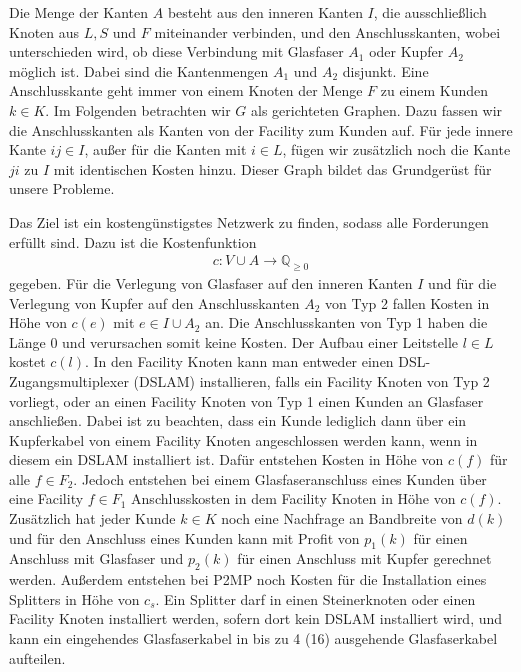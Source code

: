 \documentclass[11pt,a4paper]{article}
\newcommand{\Q}{\mathbb{Q}}
\theoremstyle{my_th_style1}
\begin{document}
Die Menge der Kanten $A$ besteht aus den inneren Kanten $I$, die ausschließlich Knoten aus \(L, S\) und \(F\) miteinander verbinden, und den Anschlusskanten, wobei unterschieden wird, ob diese Verbindung mit Glasfaser \(A_1\) oder Kupfer $A_2$ möglich ist.
Dabei sind die Kantenmengen $A_1$ und $A_2$ disjunkt.
Eine Anschlusskante geht immer von einem Knoten der Menge $F$ zu einem Kunden $k \in K$. 
Im Folgenden betrachten wir $G$ als gerichteten Graphen.
Dazu fassen wir die Anschlusskanten als Kanten von der Facility zum Kunden auf.
Für jede innere Kante $ij \in I$, außer für die Kanten mit $i \in L$, fügen wir zusätzlich noch die Kante $ji$ zu $I$ mit identischen Kosten hinzu.
Dieser Graph bildet das Grundgerüst für unsere Probleme.

Das Ziel ist ein kosteng\"unstigstes Netzwerk zu finden, sodass alle Forderungen erf\"ullt sind.
Dazu ist die Kostenfunktion 
\begin{align}
\label{Kostenfunktion}
c: V \cup A \rightarrow \Q_{\geq 0}
\end{align}
 gegeben.
Für die Verlegung von Glasfaser auf den inneren Kanten $I$ und f\"ur die Verlegung von Kupfer auf den Anschlusskanten \(A_2\) von Typ 2 fallen Kosten in Höhe von $c(e)$ mit $e \in I \cup A_2$ an.
Die  Anschlusskanten von Typ 1 haben die Länge 0 und verursachen somit keine Kosten.
Der Aufbau einer Leitstelle $ l\in L$ kostet $c(l)$. 
In den Facility Knoten kann man entweder einen DSL-Zugangsmultiplexer (DSLAM) installieren, falls ein Facility Knoten von Typ 2 vorliegt, oder an einen Facility Knoten von Typ 1 einen Kunden an Glasfaser anschließen.
Dabei ist zu beachten, dass ein Kunde lediglich dann \"uber ein Kupferkabel von einem Facility Knoten angeschlossen werden kann, wenn in diesem ein DSLAM installiert ist.
Dafür entstehen Kosten in Höhe von $c(f)$ für alle $f \in F_2$.
Jedoch entstehen bei einem Glasfaseranschluss eines Kunden \"uber eine Facility \(f \in F_1\) Anschlusskosten in dem Facility Knoten in H\"ohe von \(c(f)\).
Zusätzlich hat jeder Kunde \(k \in K\) noch eine Nachfrage an Bandbreite von $d(k)$ und für den Anschluss eines Kunden kann mit Profit von $p_1(k)$ für einen Anschluss mit Glasfaser und $p_2(k)$ für einen Anschluss mit Kupfer gerechnet werden.
Außerdem entstehen bei P2MP noch Kosten für die Installation eines Splitters in H\"ohe von $c_s$.
Ein Splitter darf in einen Steinerknoten oder einen Facility Knoten installiert werden, sofern dort kein DSLAM installiert wird, und kann ein eingehendes Glasfaserkabel in bis zu 4 (16) ausgehende Glasfaserkabel aufteilen.
\end{document}
